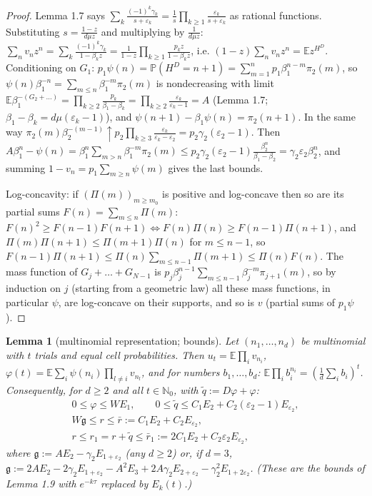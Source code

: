 \documentclass[11pt,a4paper]{article}
\newtheorem{lemma}[theorem]{Lemma}
\theoremstyle{definition}
\theoremstyle{remark}
\begin{document}
\begin{proof}
Lemma 1.7 says $\sum_k\frac{(-1)^k\gamma_k}{s+\varepsilon_k}=\frac1s\prod_{k\ge1}\frac{\varepsilon_k}{s+\varepsilon_k}$ as rational functions. Substituting $s=\frac{1-z}{d\mu z}$ and multiplying by $\frac{1}{d\mu z}$: $\sum_nv_nz^n=\sum_k\frac{(-1)^k\gamma_k}{1-\beta_kz}=\frac{1}{1-z}\prod_{k\ge1}\frac{p_kz}{1-\beta_kz}$, i.e. $(1-z)\sum_nv_nz^n=\mathbb E z^{H^D}$. Conditioning on $G_1$: $p_1\psi(n)=\mathbb P(H^D=n+1)=\sum_{m=1}^np_1\beta_1^{n-m}\pi_2(m)$, so $\psi(n)\beta_1^{-n}=\sum_{m\le n}\beta_1^{-m}\pi_2(m)$ is nondecreasing with limit $\mathbb E\beta_1^{-(G_2+\dots)}=\prod_{k\ge2}\frac{p_k}{\beta_1-\beta_k}=\prod_{k\ge2}\frac{\varepsilon_k}{\varepsilon_k-1}=A$ (Lemma 1.7; $\beta_1-\beta_k=d\mu(\varepsilon_k-1)$), and $\psi(n+1)-\beta_1\psi(n)=\pi_2(n+1)$. In the same way $\pi_2(m)\beta_2^{-(m-1)}\uparrow p_2\prod_{k\ge3}\frac{\varepsilon_k}{\varepsilon_k-\varepsilon_2}=p_2\gamma_2(\varepsilon_2-1)$. Then $A\beta_1^n-\psi(n)=\beta_1^n\sum_{m>n}\beta_1^{-m}\pi_2(m)\le p_2\gamma_2(\varepsilon_2-1)\frac{\beta_2^n}{\beta_1-\beta_2}=\gamma_2\varepsilon_2\beta_2^n$, and summing $1-v_n=p_1\sum_{m\ge n}\psi(m)$ gives the last bounds.

Log-concavity: if $(\Pi(m))_{m\ge m_0}$ is positive and log-concave then so are its partial sums $F(n)=\sum_{m\le n}\Pi(m)$: $F(n)^2\ge F(n-1)F(n+1)\iff F(n)\Pi(n)\ge F(n-1)\Pi(n+1)$, and $\Pi(m)\Pi(n+1)\le\Pi(m+1)\Pi(n)$ for $m\le n-1$, so $F(n-1)\Pi(n+1)\le\Pi(n)\sum_{m\le n-1}\Pi(m+1)\le\Pi(n)F(n)$. The mass function of $G_j+\dots+G_{N-1}$ is $p_j\beta_j^{n-1}\sum_{m\le n-1}\beta_j^{-m}\pi_{j+1}(m)$, so by induction on $j$ (starting from a geometric law) all these mass functions, in particular $\psi$, are log-concave on their supports, and so is $v$ (partial sums of $p_1\psi$).
\end{proof}

\begin{lemma}[{multinomial representation; bounds}]
Let $(n_1,\dots,n_d)$ be multinomial with $t$ trials and equal cell probabilities. Then $u_t=\mathbb E\prod_iv_{n_i}$, $\varphi(t)=\mathbb E\sum_i\psi(n_i)\prod_{l\ne i}v_{n_l}$, and for numbers $b_1,\dots,b_d$: $\mathbb E\prod_ib_i^{n_i}=(\frac1d\sum_ib_i)^t$. Consequently, for $d\ge2$ and all $t\in\mathbb N_0$, with $\tilde q:=D\varphi+\varphi$:
\begin{gather*}
0\le\varphi\le WE_1, \qquad 0\le\tilde q\le C_1E_2+C_2(\varepsilon_2-1)E_{\varepsilon_2}, \\
W\mathfrak g\le r\le\bar r:=C_1E_2+C_2E_{\varepsilon_2}, \\
r\le r_1=r+\tilde q\le\bar r_1:=2C_1E_2+C_2\varepsilon_2E_{\varepsilon_2},
\end{gather*}
where $\mathfrak g:=AE_2-\gamma_2E_{1+\varepsilon_2}$ (any $d\ge2$) or, if $d=3$, $\mathfrak g:=2AE_2-2\gamma_2E_{1+\varepsilon_2}-A^2E_3+2A\gamma_2E_{2+\varepsilon_2}-\gamma_2^2E_{1+2\varepsilon_2}$. (These are the bounds of Lemma 1.9 with $e^{-k\tau}$ replaced by $E_k(t)$.)
\end{lemma}
\end{document}
